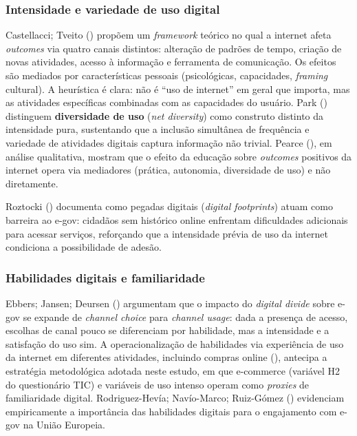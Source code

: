 \documentclass[
  man,
  floatsintext,
  longtable,
  a4paper,
  nolmodern,
  notxfonts,
  notimes,
  colorlinks=true,linkcolor=blue,citecolor=blue,urlcolor=blue]{apa7}
\begin{document}
\subsubsection{Intensidade e variedade de uso
digital}\label{intensidade-e-variedade-de-uso-digital}

Castellacci; Tveito ()
propõem um \emph{framework} teórico no qual a internet afeta
\emph{outcomes} via quatro canais distintos: alteração de padrões de
tempo, criação de novas atividades, acesso à informação e ferramenta de
comunicação. Os efeitos são mediados por características pessoais
(psicológicas, capacidades, \emph{framing} cultural). A heurística é
clara: não é ``uso de internet'' em geral que importa, mas as atividades
específicas combinadas com as capacidades do usuário. Park
() distinguem
\textbf{diversidade de uso} (\emph{net diversity}) como construto
distinto da intensidade pura, sustentando que a inclusão simultânea de
frequência e variedade de atividades digitais captura informação não
trivial. Pearce (), em análise
qualitativa, mostram que o efeito da educação sobre \emph{outcomes}
positivos da internet opera via mediadores (prática, autonomia,
diversidade de uso) e não diretamente.

Roztocki () documenta como
pegadas digitais (\emph{digital footprints}) atuam como barreira ao
e-gov: cidadãos sem histórico online enfrentam dificuldades adicionais
para acessar serviços, reforçando que a intensidade prévia de uso da
internet condiciona a possibilidade de adesão.

\subsubsection{Habilidades digitais e
familiaridade}\label{habilidades-digitais-e-familiaridade}

Ebbers; Jansen; Deursen ()
argumentam que o impacto do \emph{digital divide} sobre e-gov se expande
de \emph{channel choice} para \emph{channel usage}: dada a presença de
acesso, escolhas de canal pouco se diferenciam por habilidade, mas a
intensidade e a satisfação do uso sim. A operacionalização de
habilidades via experiência de uso da internet em diferentes atividades,
incluindo compras online (), antecipa a estratégia metodológica adotada neste estudo, em que
e-commerce (variável H2 do questionário TIC) e variáveis de uso intenso
operam como \emph{proxies} de familiaridade digital. Rodriguez-Hevía;
Navío-Marco; Ruiz-Gómez ()
evidenciam empiricamente a importância das habilidades digitais para o
engajamento com e-gov na União Europeia.
\end{document}
